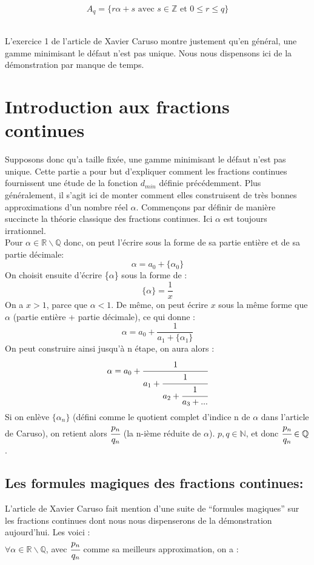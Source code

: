 \documentclass[moyen]{classeUPD}
\begin{document}
\begin{equation}
A_{q}=\{r\alpha+s \text{ avec }s \in\mathbb{Z}\text{ et } 0 \leq r \le q \}
\label{equation 1}
\end{equation}\

L’exercice 1 de l'article de Xavier Caruso montre justement qu'en général, une gamme minimisant le défaut n'est pas unique. Nous nous dispensons ici de la démonstration par manque de temps.



\chapter{Introduction aux fractions continues}

Supposons donc qu’a taille fixée, une gamme minimisant le défaut n’est pas unique. Cette partie a pour but d’expliquer comment les fractions continues fournissent une étude de la fonction $d_{min}$ définie précédemment. Plus généralement, il s’agit ici de monter comment elles construisent de très bonnes approximations d’un nombre réel $\alpha$. Commençons par définir de manière succincte la théorie classique des fractions continues. Ici $\alpha$ est toujours irrationnel.\\

Pour $\alpha \in \mathbb{R}\backslash\mathbb{Q}$ donc, on peut l'écrire sous la forme de sa partie entière et de sa partie décimale:
$$\alpha = a_{0}+\{\alpha_{0}\}$$
On choisit ensuite d'écrire \{$\alpha$\} sous la forme de :
$$\{\alpha\} = \frac{1}{x}$$
On a $x>1$, parce que $\alpha < 1$. De même, on peut écrire $x$ sous la même forme que $\alpha$ (partie entière + partie décimale), ce qui donne :
$$\alpha = a_{0}+ \frac{1}{a_{1}+\{\alpha_{1}\}}$$
On peut construire ainsi jusqu'à n étape, on aura alors :
$$\alpha=a_{0}+\cfrac{1}{a_{1}+\cfrac{1}{a_{2}+\cfrac{1}{a_{3}+...}}}$$
Si on enlève $\{\alpha_{n}\}$ (défini comme le quotient complet d'indice n de $\alpha$ dans l'article de Caruso), on retient alors $\cfrac{p_{n}}{q_{n}}$ (la n-ième réduite de $\alpha$). $p,q \in \mathbb{N}$, et donc $\cfrac{p_{n}}{q_{n}} \in \mathbb{Q} $ .

\section*{ Les formules magiques des fractions continues:}
L’article de Xavier Caruso fait mention d’une suite de “formules magiques” sur les fractions continues dont nous nous dispenserons de la démonstration aujourd’hui. Les voici :\\
$\forall \alpha \in \mathbb{R}\backslash\mathbb{Q}$, avec $\cfrac{p_{n}}{q_{n}}$ comme sa meilleurs approximation, on a :
\end{document}
